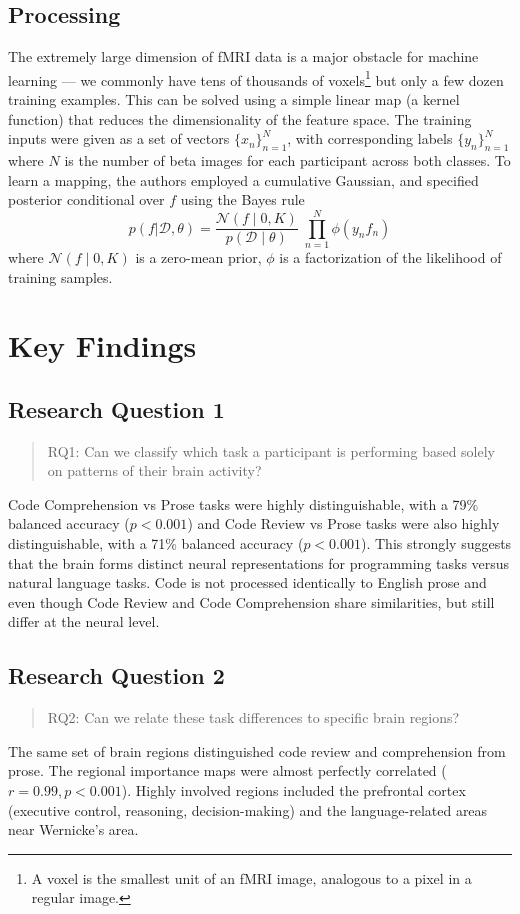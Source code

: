 \subsection{Processing}
The extremely large dimension of fMRI data is a major obstacle for machine learning — we commonly have tens of thousands of voxels\footnote{A voxel is the smallest unit of an fMRI image, analogous to a pixel in a regular image.} but only a few dozen training examples. This can be solved using a simple linear map (a kernel function) that reduces the dimensionality of the feature space. The training inputs were given as a set of vectors $\{x_n\}_{n=1}^N$, with corresponding labels $\{y_n\}_{n=1}^N$ where $N$ is the number of beta images for each participant across both classes. To learn a mapping, the authors employed a cumulative Gaussian, and specified posterior conditional over $f$ using the Bayes rule
\begin{equation*}
    p(f|\mathcal D,\theta) = \frac{\mathcal N(f\mid 0, K)}{p(\mathcal D \mid \theta)} \; \prod^N_{n=1} \phi(y_n f_n)
\end{equation*}
where $\mathcal N(f\mid 0, K)$ is a zero-mean prior, $\phi$ is a factorization of the likelihood of training samples.

\section{Key Findings}
\subsection{Research Question 1}
\begin{quote}
    RQ1: Can we classify which task a participant is performing based solely on patterns of their brain activity?
\end{quote}
Code Comprehension vs Prose tasks were highly distinguishable, with a 79\% balanced accuracy ($p < 0.001$) and Code Review vs Prose tasks were also highly distinguishable, with a 71\% balanced accuracy ($p < 0.001$). This strongly suggests that the brain forms distinct neural representations for programming tasks versus natural language tasks. Code is not processed identically to English prose and even though Code Review and Code Comprehension share similarities, but still differ at the neural level.

\subsection{Research Question 2}
\begin{quote}
    RQ2: Can we relate these task differences to specific brain regions?
\end{quote}
The same set of brain regions distinguished code review and comprehension from prose. The regional importance maps were almost perfectly correlated ($r = 0.99, p < 0.001$). Highly involved regions included the prefrontal cortex (executive control, reasoning, decision-making) and the language-related areas near Wernicke’s area.

